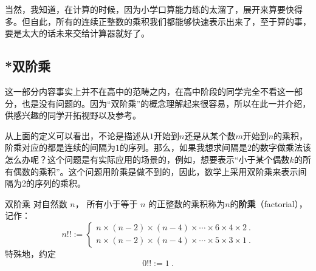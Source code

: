 当然，我知道，在计算的时候，因为小学口算能力练的太溜了，展开来算要快得多。但自此，所有的连续正整数的乘积我们都能够快速表示出来了，至于算的事，要是太大的话未来交给计算器就好了。

\subsection{*双阶乘}

这一部分内容事实上并不在高中的范畴之内，在高中阶段的同学完全不看这一部分，也是没有问题的。因为“双阶乘”的概念理解起来很容易，所以在此一并介绍，供感兴趣的同学开拓视野以及参考。

从上面的定义可以看出，不论是描述从$1$开始到$n$还是从某个数$m$开始到$n$的乘积，阶乘对应的都是连续的间隔为$1$的序列。那么，如果我想求间隔是$2$的数字做乘法该怎么办呢？这个问题是有实际应用的场景的，例如，想要表示“小于某个偶数$k$的所有偶数的乘积”。这个问题用阶乘是做不到的，因此，数学上采用双阶乘来表示间隔为2的序列的乘积。

\begin{definition}{双阶乘}
对自然数 $n$， 所有小于等于 $n$ 的正整数的乘积称为$n$的\textbf{阶乘}（factorial），记作：
\begin{equation}
n!! :=
\begin{cases}
n \times (n-2) \times (n-4)\times \cdots \times6\times4\times 2 ~.\\  
n \times (n-2) \times (n-4)\times \cdots \times5\times3\times 1~.
\end{cases} 
\end{equation}
特殊地，约定
\begin{equation}
0!! := 1~.
\end{equation}
\end{definition}
